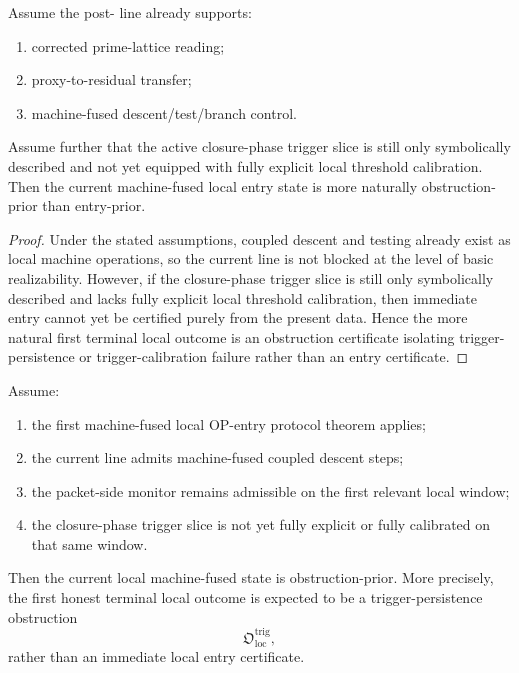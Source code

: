 \begin{proposition}
\label{prop:current-local-state-more-naturally-obstruction-prior}
Assume the post- line already supports:
\begin{enumerate}
 \item corrected prime-lattice reading;
 \item proxy-to-residual transfer;
 \item machine-fused descent/test/branch control.
\end{enumerate}
Assume further that the active closure-phase trigger slice is still only symbolically described and not yet equipped with fully explicit local threshold calibration.
Then the current machine-fused local entry state is more naturally obstruction-prior than entry-prior.
\end{proposition}

\begin{proof}
Under the stated assumptions, coupled descent and testing already exist as local machine operations, so the current line is not blocked at the level of basic realizability.
However, if the closure-phase trigger slice is still only symbolically described and lacks fully explicit local threshold calibration, then immediate entry cannot yet be certified purely from the present data.
Hence the more natural first terminal local outcome is an obstruction certificate isolating trigger-persistence or trigger-calibration failure rather than an entry certificate.
\end{proof}

\begin{theorem}
\label{thm:first-local-obstruction-priority-theorem}
Assume:
\begin{enumerate}
 \item the first machine-fused local OP-entry protocol theorem applies;
 \item the current line admits machine-fused coupled descent steps;
 \item the packet-side monitor remains admissible on the first relevant local window;
 \item the closure-phase trigger slice is not yet fully explicit or fully calibrated on that same window.
\end{enumerate}
Then the current local machine-fused state is obstruction-prior.
More precisely, the first honest terminal local outcome is expected to be a trigger-persistence obstruction
\[
\mathfrak{O}_{\mathrm{loc}}^{\mathrm{trig}},
\]
rather than an immediate local entry certificate.
\end{theorem}

